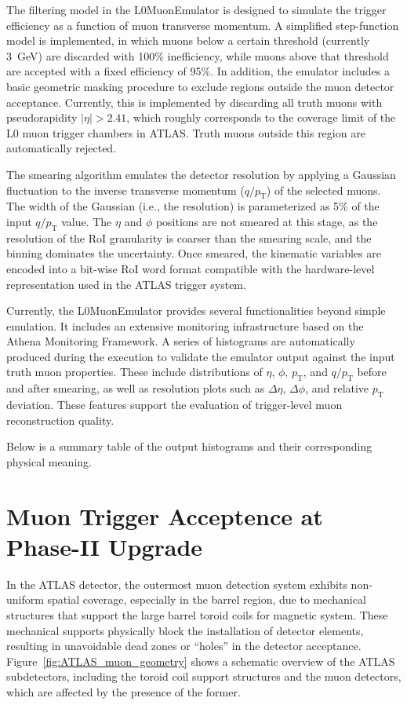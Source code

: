 The filtering model in the L0MuonEmulator is designed to simulate the trigger efficiency as a function of muon transverse momentum. A simplified step-function model is implemented, in which muons below a certain threshold (currently 3~GeV) are discarded with 100\% inefficiency, while muons above that threshold are accepted with a fixed efficiency of 95\%. In addition, the emulator includes a basic geometric masking procedure to exclude regions outside the muon detector acceptance. Currently, this is implemented by discarding all truth muons with pseudorapidity $|\eta| > 2.41$, which roughly corresponds to the coverage limit of the L0 muon trigger chambers in ATLAS. Truth muons outside this region are automatically rejected.

The smearing algorithm emulates the detector resolution by applying a Gaussian fluctuation to the inverse transverse momentum ($q/p_\mathrm{T}$) of the selected muons. The width of the Gaussian (i.e., the resolution) is parameterized as 5\% of the input $q/p_\mathrm{T}$ value. The $\eta$ and $\phi$ positions are not smeared at this stage, as the resolution of the RoI granularity is coarser than the smearing scale, and the binning dominates the uncertainty. Once smeared, the kinematic variables are encoded into a bit-wise RoI word format compatible with the hardware-level representation used in the ATLAS trigger system.

Currently, the L0MuonEmulator provides several functionalities beyond simple emulation. It includes an extensive monitoring infrastructure based on the Athena Monitoring Framework. A series of histograms are automatically produced during the execution to validate the emulator output against the input truth muon properties. These include distributions of $\eta$, $\phi$, $p_\mathrm{T}$, and $q/p_\mathrm{T}$ before and after smearing, as well as resolution plots such as $\Delta\eta$, $\Delta\phi$, and relative $p_\mathrm{T}$ deviation. These features support the evaluation of trigger-level muon reconstruction quality.

Below is a summary table of the output histograms and their corresponding physical meaning.


\section{Muon Trigger Acceptence at Phase-II Upgrade} \label{subsec:MuonTriggerAcceptance}
In the ATLAS detector, the outermost muon detection system exhibits non-uniform spatial coverage, especially in the barrel region, due to mechanical structures that support the large barrel toroid coils for magnetic system. These mechanical supports physically block the installation of detector elements, resulting in unavoidable dead zones or ``holes'' in the detector acceptance. Figure~\ref{fig:ATLAS_muon_geometry} shows a schematic overview of the ATLAS subdetectors, including the toroid coil support structures and the muon detectors, which are affected by the presence of the former.

